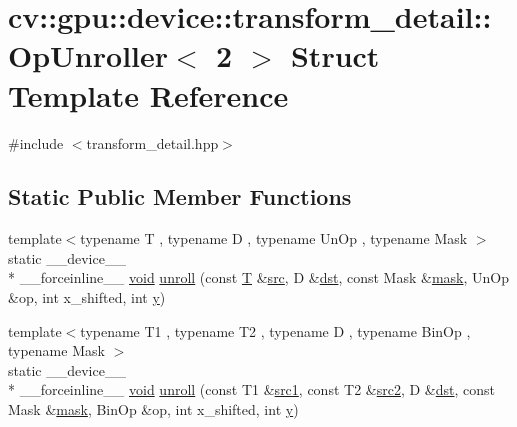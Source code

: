 \hypertarget{structcv_1_1gpu_1_1device_1_1transform__detail_1_1OpUnroller_3_012_01_4}{\section{cv\-:\-:gpu\-:\-:device\-:\-:transform\-\_\-detail\-:\-:Op\-Unroller$<$ 2 $>$ Struct Template Reference}
\label{structcv_1_1gpu_1_1device_1_1transform__detail_1_1OpUnroller_3_012_01_4}
}


{\ttfamily \#include $<$transform\-\_\-detail.\-hpp$>$}

\subsection*{Static Public Member Functions}
\begin{DoxyCompactItemize}
\item 
{\footnotesize template$<$typename T , typename D , typename Un\-Op , typename Mask $>$ }\\static \-\_\-\-\_\-device\-\_\-\-\_\- \\*
\-\_\-\-\_\-forceinline\-\_\-\-\_\- \hyperlink{legacy_8hpp_a8bb47f092d473522721002c86c13b94e}{void} \hyperlink{structcv_1_1gpu_1_1device_1_1transform__detail_1_1OpUnroller_3_012_01_4_a25ed1bab7f6d00fac4c95dd4f9ccee8d}{unroll} (const \hyperlink{calib3d_8hpp_a3efb9551a871ddd0463079a808916717}{T} \&\hyperlink{legacy_8hpp_a371cd109b74033bc4366f584edd3dacc}{src}, D \&\hyperlink{photo__c_8h_aed13e2a25279b24dc954073233fef7a5}{dst}, const Mask \&\hyperlink{tracking_8hpp_a6b13ecd2fd6ec7ad422f1d7863c3ad19}{mask}, Un\-Op \&op, int x\-\_\-shifted, int \hyperlink{highgui__c_8h_af1202c02b14870c18fb3a1da73e9e7c7}{y})
\item 
{\footnotesize template$<$typename T1 , typename T2 , typename D , typename Bin\-Op , typename Mask $>$ }\\static \-\_\-\-\_\-device\-\_\-\-\_\- \\*
\-\_\-\-\_\-forceinline\-\_\-\-\_\- \hyperlink{legacy_8hpp_a8bb47f092d473522721002c86c13b94e}{void} \hyperlink{structcv_1_1gpu_1_1device_1_1transform__detail_1_1OpUnroller_3_012_01_4_a542fece996af99c046d9e9c82e0fa531}{unroll} (const T1 \&\hyperlink{core__c_8h_a897de4702c922f4cccda0d57ccdcafb3}{src1}, const T2 \&\hyperlink{core__c_8h_a7561a36d48069d54a6c8ac4e4750edfd}{src2}, D \&\hyperlink{photo__c_8h_aed13e2a25279b24dc954073233fef7a5}{dst}, const Mask \&\hyperlink{tracking_8hpp_a6b13ecd2fd6ec7ad422f1d7863c3ad19}{mask}, Bin\-Op \&op, int x\-\_\-shifted, int \hyperlink{highgui__c_8h_af1202c02b14870c18fb3a1da73e9e7c7}{y})
\end{DoxyCompactItemize}


